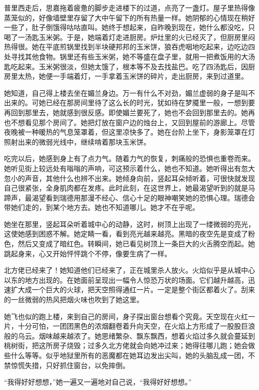 \par 普里西走后，思嘉拖着疲惫的脚步走进楼下的过道，点亮了一盏灯。屋子里热得像蒸笼似的，好像墙壁里存留了大中午留下的所有热量一样。她阴郁的心情现在稍好一些了，肚子倒饿得咕咕直叫。她终于想起来，自昨晚到现在，她什么都没吃，只喝了一汤匙玉米粥。于是，她端着灯走进厨房。炉灶里的火已经灭了，但厨房里闷热得很。她在平底煎锅里找到半块硬邦邦的玉米饼，狼吞虎咽地吃起来，边吃边四处寻找其他食物。锅里还有些玉米粥，她不等盛在盘子里，就用一把煮饭用的大汤匙吃起来。玉米粥很淡，但她太饿了，根本等不及去找盐巴。吃了四汤匙后，因厨房里太热，她便一手端着灯，一手拿着玉米饼的碎片，走出厨房，来到过道里。
\par 她知道，自己得上楼去坐在媚兰身边。万一有什么不对劲，媚兰虚弱的身子是叫不出来的。可她已经在那房间里待了这么长的时光，犹如待在梦魇里一般，一想到要再回到那里去，她就感到很反感。即使媚兰要死了，她也不会回到那里去的。她再也不想看见那个房间了。她把灯放在窗户边的烛台上，又回到屋前的游廊上。尽管夜晚被一种暖热的气息笼罩着，但这里凉快多了。她在台阶上坐下，身影笼罩在灯照射出来的微弱光线中，继续啃着那块玉米饼。
\par 吃完以后，她感到身上有了点力气。随着力气的恢复，刺痛般的恐惧也重卷而来。她听见街上较远处有嗡嗡的声响，可这预示着什么，她也不知道。她听得出有忽大忽小的声音，其他什么也辨不出来。她倾身向前，竖起耳朵倾听着，可很快就发现自己很紧张，全身肌肉都在发疼。此时此刻，在这世界上，她最渴望听到的就是马蹄声，最渴望看到瑞德用那漫不经心、信心十足的眼神嘲笑她的恐惧心理。瑞德会带她们走的，到某个地方去。她也不知道哪儿。她才不在乎呢。
\par 她坐在那里，竖起耳朵听着城中心的动静，这时，树顶上出现了一缕微弱的亮光，这使她感到困惑不解。她定睛一看，看到亮光越来越亮。黑暗的夜空先是变成了粉色，然后又变成了暗红色。转瞬间，她已看见树顶上一条巨大的火舌腾空而起。她跳起身来，心又开始怦怦跳个不停，像要生病了一样。
\par 北方佬已经来了！她知道他们已经来了，正在城里杀人放火。火焰似乎是从城中心以东的地方出现的。在她面前呈现出一幅令人惊恐万状的场面。它们越升越高，迅速扩大成一个巨大的火球，把天空照得通红一片。一定是整个街区都着火了。刮来的一丝微弱的热风把烟火味也吹到了她这里。
\par 她飞也似的跑上楼，来到自己的房间，身子探出窗台想看个究竟。天空现在火红一片，十分可怕，一团团黑色的浓烟翻卷着升向天空，在火焰上方形成了一股股巨浪般的乌云。烟味越来越浓了。她思绪繁杂、飘东飘西，想着火焰过多久就会蔓延到桃树街，把这所房子烧毁；过多久北方佬就会向她冲过来；她得往哪儿跑；她会做些什么等等。似乎地狱里所有的恶魔都在她耳边发出尖叫，她的头脑乱成一团，不禁惊慌失措，只好抓住窗台，以免摔倒。
\par “我得好好想想，”她一遍又一遍地对自己说，“我得好好想想。”
